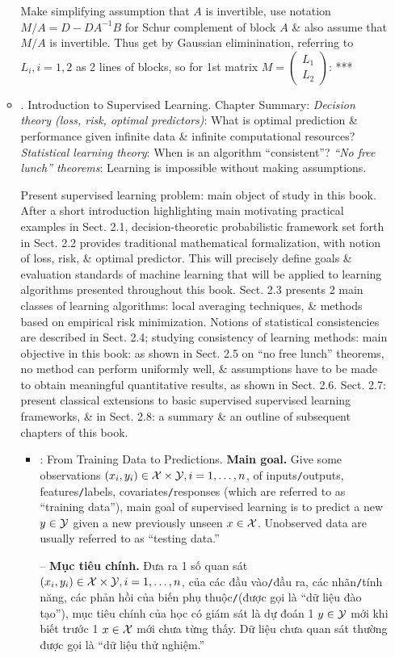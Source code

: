 \documentclass{article}
\begin{document}
\begin{enumerate}
\begin{itemize}
		Make simplifying assumption that $A$ is invertible, use notation $M/A = D - DA^{-1}B$ for Schur complement of block $A$ \& also assume that $M/A$ is invertible. Thus get by Gaussian eliminination, referring to $L_i,i = 1,2$ as 2 lines of blocks, so for 1st matrix $M = \begin{pmatrix}
			L_1\\L_2
		\end{pmatrix}$: ***
		\item {. Introduction to Supervised Learning.} Chapter Summary: {\it Decision theory (loss, risk, optimal predictors)}: What is optimal prediction \& performance given infinite data \& infinite computational resources? {\it Statistical learning theory}: When is an algorithm ``consistent''? {\it``No free lunch'' theorems}: Learning is impossible without making assumptions.
		
		Present supervised learning problem: main object of study in this book. After a short introduction highlighting main motivating practical examples in Sect. 2.1, decision-theoretic probabilistic framework set forth in Sect. 2.2 provides traditional mathematical formalization, with notion of loss, risk, \& optimal predictor. This will precisely define goals \& evaluation standards of machine learning that will be applied to learning algorithms presented throughout this book. Sect. 2.3 presents 2 main classes of learning algorithms: local averaging techniques, \& methods based on empirical risk minimization. Notions of statistical consistencies are described in Sect. 2.4; studying consistency of learning methods: main objective in this book: as shown in Sect. 2.5 on ``no free lunch'' theorems, no method can perform uniformly well, \& assumptions have to be made to obtain meaningful quantitative results, as shown in Sect. 2.6. Sect. 2.7: present classical extensions to basic supervised supervised learning frameworks, \& in Sect. 2.8: a summary \& an outline of subsequent chapters of this book.
		\begin{itemize}
			\item {: From Training Data to Predictions.} {\bf Main goal.} Give some observations $(x_i,y_i)\in{\cal X}\times{\cal Y},i = 1,\ldots,n$, of inputs{\tt/}outputs, features{\tt/}labels, covariates{\tt/}responses (which are referred to as ``training data''), main goal of supervised learning is to predict a new $y\in{\cal Y}$ given a new previously unseen $x\in{\cal X}$. Unobserved data are usually referred to as ``testing data.''
			
			-- {\bf Mục tiêu chính.} Đưa ra 1 số quan sát $(x_i,y_i)\in{\cal X}\times{\cal Y},i = 1,\ldots,n$, của các đầu vào{\tt/}đầu ra, các nhãn{\tt/}tính năng, các phản hồi của biến phụ thuộc{\tt/}(được gọi là ``dữ liệu đào tạo''), mục tiêu chính của học có giám sát là dự đoán 1 $y\in{\cal Y}$ mới khi biết trước 1 $x\in{\cal X}$ mới chưa từng thấy. Dữ liệu chưa quan sát thường được gọi là ``dữ liệu thử nghiệm.''
			

\end{itemize}
\end{itemize}
\end{enumerate}
\end{document}
